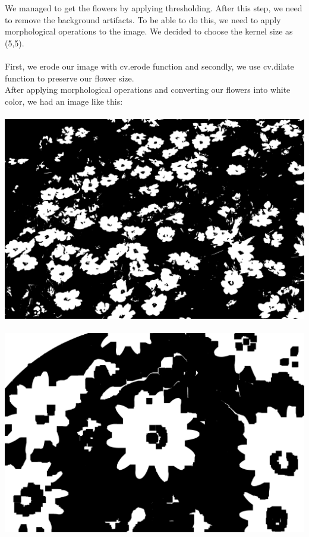 \documentclass[conference]{IEEEtran}
\begin{document}
We managed to get the flowers by applying thresholding. After this step, we need to remove the background artifacts. To be able to do this, we need to apply morphological operations to the image. We decided to choose the kernel size as (5,5). \\ \\

First, we erode our image with cv.erode function and secondly, we use cv.dilate function to preserve our flower size. \\

After applying morphological operations and converting our flowers into white color, we had an image like this: \\ \\
\includegraphics[scale=0.04]{A1.png} \\ \\
\includegraphics[scale=0.04]{A2.png} \\ \\
\end{document}
